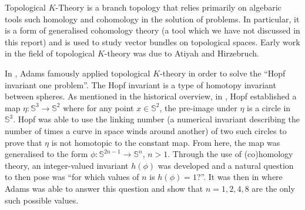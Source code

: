 \documentclass[12pt,a4paper]{article}
\begin{document}

Topological $K$-Theory is a branch topology that relies primarily on algebaric tools such homology and cohomology in the solution of problems. In particular, it is a form of generalised cohomology theory (a tool which we have not discussed in this report) and is used to study vector bundles on topological spaces. Early work in the field of topological $K$-theory was due to Atiyah and Hirzebruch. 

In \cite{MR0141119}, Adams famously applied topological $K$-theory in order to solve the ``Hopf invariant one problem''. The Hopf invariant is a type of homotopy invariant between spheres. As mentioned in the historical overview, in \cite{MR1512691}, Hopf established a map $\eta:\mathbb{S}^3\to\mathbb{S}^2$ where for any point $x\in\mathbb{S}^2$, the pre-image under $\eta$ is a circle in $\mathbb{S}^3$. Hopf was able to use the linking number (a numerical invariant describing the number of times a curve in space winds around another) of two such circles to prove that $\eta$ is not homotopic to the constant map. From here, the map was generalised to the form $\phi:\mathbb{S}^{2n-1}\to\mathbb{S}^n$, $n>1$. Through the use of (co)homology theory, an integer-valued invariant $h(\phi)$ was developed and a natural question to then pose was ``for which values of $n$ is $h(\phi)=1$?''. It was then in \cite{MR0141119} where Adams was able to answer this question and show that $n=1,2,4,8$ are the only such possible values.
\end{document}
